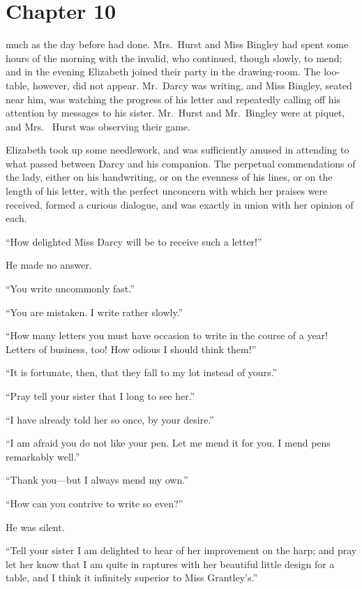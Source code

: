 \chapter{Chapter 10}


 much as the day before had done.  Mrs.\ Hurst
and Miss Bingley had spent some hours of the morning with the
invalid, who continued, though slowly, to mend; and in the
evening Elizabeth joined their party in the drawing-room.  The
loo-table, however, did not appear.  Mr.\ Darcy was writing, and
Miss Bingley, seated near him, was watching the progress of his
letter and repeatedly calling off his attention by messages to
his sister.  Mr.\ Hurst and Mr.\ Bingley were at piquet, and Mrs.\ %
Hurst was observing their game.

Elizabeth took up some needlework, and was sufficiently
amused in attending to what passed between Darcy and his
companion.  The perpetual commendations of the lady, either on
his handwriting, or on the evenness of his lines, or on the length
of his letter, with the perfect unconcern with which her praises
were received, formed a curious dialogue, and was exactly in
union with her opinion of each.

``How delighted Miss Darcy will be to receive such a letter!''

He made no answer.

``You write uncommonly fast.''

``You are mistaken.  I write rather slowly.''

``How many letters you must have occasion to write in the
course of a year!  Letters of business, too!  How odious I should
think them!''

``It is fortunate, then, that they fall to my lot instead of yours.''

``Pray tell your sister that I long to see her.''

``I have already told her so once, by your desire.''

``I am afraid you do not like your pen.  Let me mend it for you.
I mend pens remarkably well.''

``Thank you---but I always mend my own.''

``How can you contrive to write so even?''

He was silent.

``Tell your sister I am delighted to hear of her improvement on
the harp; and pray let her know that I am quite in raptures with
her beautiful little design for a table, and I think it infinitely
superior to Miss Grantley's.''

